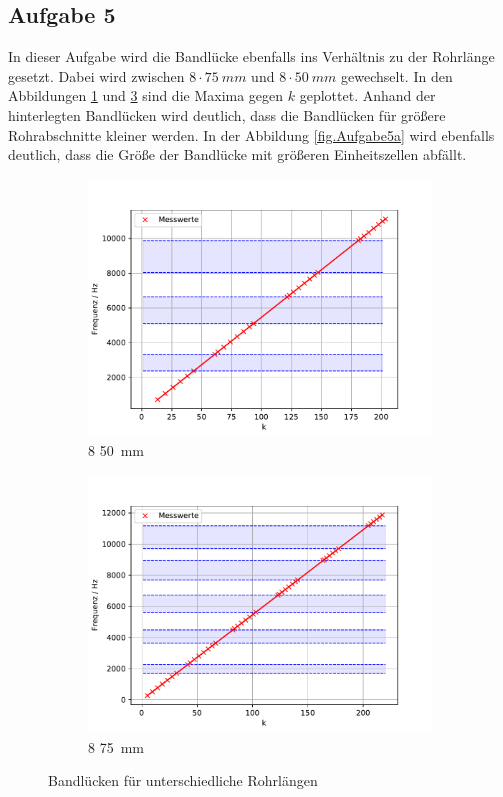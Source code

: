 \subsection{Aufgabe 5}
In dieser Aufgabe wird die Bandlücke ebenfalls ins Verhältnis zu der Rohrlänge gesetzt. Dabei wird zwischen $8 \cdot \SI{75}{mm}$ und $8 \cdot \SI{50}{mm}$ gewechselt.
In den Abbildungen \ref{fig.Aufgabe5} und \ref{fig.Aufgabe575} sind die Maxima gegen $k$ geplottet. Anhand der hinterlegten Bandlücken wird deutlich, dass die Bandlücken für größere Rohrabschnitte kleiner werden.
In der Abbildung \ref{fig.Aufgabe5a} wird ebenfalls deutlich, dass die Größe der Bandlücke mit größeren Einheitszellen abfällt.

\begin{figure}
 \centering
 \begin{subfigure}{0.48\textwidth}
  \centering
  \includegraphics[width=1\textwidth]{bla.pdf}
  \caption{8 \cdot \SI{50}{mm}}
  \label{fig.Aufgabe5}
 \end{subfigure}
 \begin{subfigure}{0.48\textwidth}
  \centering
  \includegraphics[width=1\textwidth]{bla75.pdf}
  \caption{8 \cdot \SI{75}{mm}}
  \label{fig.Aufgabe575}
 \end{subfigure}
 \caption{Bandlücken für unterschiedliche Rohrlängen}
\end{figure}
